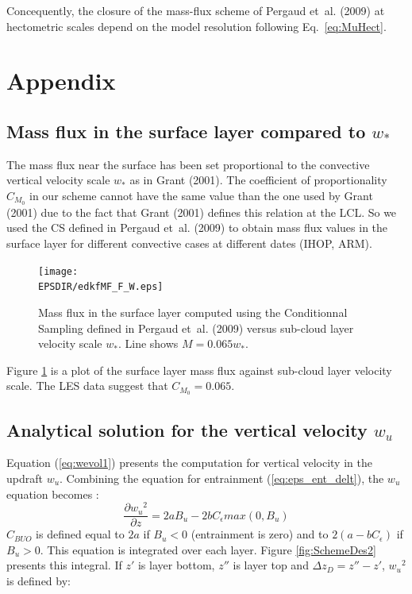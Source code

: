 Concequently, the closure of the mass-flux scheme of Pergaud et~al. (2009) at hectometric scales depend on the model resolution following Eq.~\ref{eq:MuHect}.   

\section{Appendix}
\subsection{Mass flux in the surface layer compared to $w_*$}
\label{sec:MF_W}

The mass flux near the surface has been set proportional to the convective vertical velocity scale $w_*$ as in Grant (2001). The coefficient of proportionality $C_{M_0}$ in our scheme cannot have the same value than the one used by Grant (2001) due to the fact that Grant (2001) defines this relation at the LCL. So we used the CS defined in Pergaud et~al. (2009) to obtain mass flux values in the surface layer for different convective cases at different dates (IHOP, ARM).

\begin{figure}
 \begin{center}
		\texttt{[image: \\EPSDIR/edkfMF\_F\_W.eps]}
	\end{center}
	\caption{Mass flux in the surface layer computed using the Conditionnal Sampling defined in Pergaud et~al. (2009) versus sub-cloud layer velocity scale $w_*$. Line shows $M=0.065w_*$.}
	\label{fig:MF_F_W}
\end{figure}

Figure \ref{fig:MF_F_W} is a plot of the surface layer mass flux against sub-cloud layer velocity scale. The LES data suggest that $C_{M_0}=0.065$.

\subsection{Analytical solution for the vertical velocity $w_u$}
\label{sec:annexe_w}
Equation (\ref{eq:wevol1}) presents the computation for vertical velocity in the updraft $w_u$. Combining the equation for entrainment (\ref{eq:eps_ent_delt}), the $w_u$ equation becomes :
\begin{equation}
   \frac{\partial{{w_u}^2}} {\partial{z}}=2 a B_u-2 b C_{\epsilon}max(0,B_u)
\label{eq:wevol2}
\end{equation}
$C_{BUO}$ is defined equal to $2a$ if $B_u<0$ (entrainment is zero) and to $2(a-bC_{\epsilon})$ if $B_u>0$.
This equation is integrated over each layer. Figure \ref{fig:SchemeDes2} presents this integral. If $z'$ is layer bottom, $z''$ is layer top and $\Delta z_D = z''-z'$,  ${w_u}^2$ is defined by:

